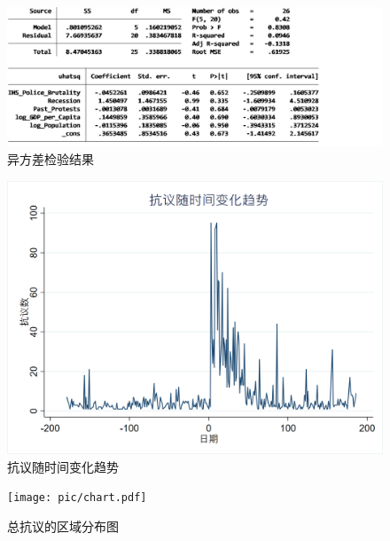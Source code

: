 \documentclass{phyasgn}\usepackage{nag}
\begin{document}
\begin{figure}[!h]
                    	\centering
                    	\includegraphics[width=1.0\linewidth]{pic/21.png}
                    	\caption{异方差检验结果}
                    	\end{figure}
\begin{figure}[!h]
                    	\centering
                    	\includegraphics[width=1.0\linewidth]{pic/22.png}
                    	\caption{抗议随时间变化趋势}
                    	\end{figure}
\begin{figure}[!h]
                    	\centering
                    	\texttt{[image: pic/chart.pdf]}
                    	\caption{总抗议的区域分布图}
                    	\end{figure}
\end{document}
